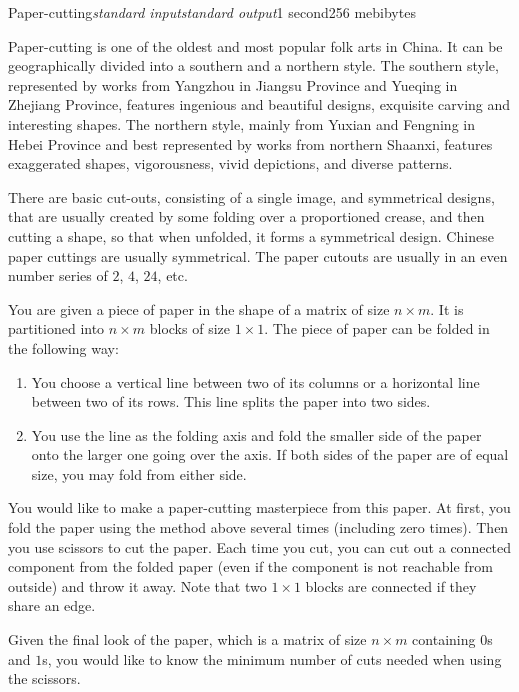 \begin{problem}{Paper-cutting}{\textsl{standard input}}{\textsl{standard output}}{1 second}{256 mebibytes}

Paper-cutting is one of the oldest and most popular folk arts in China. It can be geographically divided into a southern and a northern style. The southern style, represented by works from Yangzhou in Jiangsu Province and Yueqing in Zhejiang Province, features ingenious and beautiful designs, exquisite carving and interesting shapes. The northern style, mainly from Yuxian and Fengning in Hebei Province and best represented by works from northern Shaanxi, features exaggerated shapes, vigorousness, vivid depictions, and diverse patterns.

There are basic cut-outs, consisting of a single image, and symmetrical designs, that are usually created by some folding over a proportioned crease, and then cutting a shape, so that when unfolded, it forms a symmetrical design. Chinese paper cuttings are usually symmetrical. The paper cutouts are usually in an even number series of $2$, $4$, $24$, etc.

You are given a piece of paper in the shape of a matrix of size $n \times m$. It is partitioned into $n \times m$ blocks of size $1 \times 1$. The piece of paper can be folded in the following way:

\begin{enumerate}
\item You choose a vertical line between two of its columns or a horizontal line between two of its rows. This line splits the paper into two sides. 
\item You use the line as the folding axis and fold the smaller side of the paper onto the larger one going over the axis. If both sides of the paper are of equal size, you may fold from either side.
\end{enumerate}

You would like to make a paper-cutting masterpiece from this paper. At first, you fold the paper using the method above several times (including zero times). Then you use scissors to cut the paper. Each time you cut, you can cut out a connected component from the folded paper (even if the component is not reachable from outside) and throw it away. Note that two $1 \times 1$ blocks are connected if they share an edge.

Given the final look of the paper, which is a matrix of size $n \times m$ containing $0$s and $1$s, you would like to know the minimum number of cuts needed when using the scissors. 


\end{problem}
